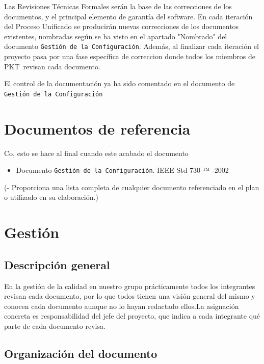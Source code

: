 \documentclass[spanish,a4paper,11pt, twoside]{report}	%
\newcommand*{\PKT}{\hbox{P}\kern-2.5pt\lower3.5pt\hbox{\small{K}}\kern-2.8pt\hbox{T}\kern-2pt}	%
\begin{document}
Las Revisiones Técnicas Formales serán la base de las correcciones de los documentos, y el principal elemento de garantía del software. En cada iteración del Proceso Unificado se producirán nuevas correcciones de los documentos existentes, nombradas según se ha visto en el apartado "Nombrado" del documento \texttt{Gestión de la Configuración}. Además, al finalizar cada iteración el proyecto pasa por una fase específica de correccion donde todos los miembros de  \PKT \ revisan cada documento.

El control de la documentación ya ha sido comentado en el documento de \texttt{Gestión de la Configuración}	

\newpage
\mbox{}
\thispagestyle{empty}						%
\newpage

\chapter{ Documentos de referencia}
	Co, esto se hace al final cuando este acabado el documento
\begin{itemize}
	\item Documento \texttt{Gestión de la Configuración}.
IEEE Std 730 ™ -2002
	
\end{itemize}	
	(- Proporciona una lista completa de cualquier documento referenciado en el plan o utilizado en su elaboración.)

\newpage
\mbox{}
\thispagestyle{empty}						%
\newpage

\chapter{ Gestión}%

	\section{ Descripción general}

	En la gestión de la calidad en nuestro grupo  prácticamente todos los integrantes revisan cada documento, por lo que todos tienen una visión general del mismo y conocen cada documento aunque no
	lo hayan redactado ellos.La asignación concreta es responsabilidad del jefe del proyecto, que indica a cada integrante qué parte de cada documento revisa.\\

	\section{Organización del documento}
\end{document}
